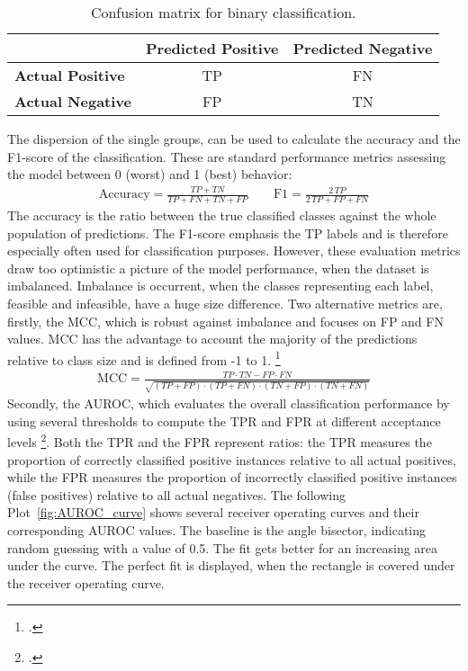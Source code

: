 \begin{table}[ht]
    \centering
    \small
    \begin{tabular}{@{}lcc@{}}
        \toprule
                                 & \textbf{Predicted Positive} & \textbf{Predicted Negative} \\
        \midrule
        \textbf{Actual Positive} & \Gls{TP}                    & \Gls{FN}                    \\
        \textbf{Actual Negative} & \Gls{FP}                    & \Gls{TN}                    \\
        \bottomrule
    \end{tabular}
    \caption{Confusion matrix for binary classification.}
    \label{tab:confusion_matrix}
\end{table}

The dispersion of the single groups, can be used to calculate the accuracy and the F1-score of the classification.
These are standard performance metrics assessing the model between 0 (worst) and 1 (best) behavior:
\begin{align}
    \text{Accuracy}=\frac{TP+TN}{TP+FN+TN+FP}
    \qquad
    \text{F1}=\frac{2\,TP}{2\,TP+FP+FN}
\end{align}
The accuracy is the ratio between the true classified classes against the whole population
of predictions. The F1-score emphasis the \gls{TP} labels and is therefore especially
often used for classification purposes.
However, these evaluation metrics draw too optimistic a picture of the model performance,
when the dataset is imbalanced. Imbalance is occurrent,
when the classes representing each label, feasible and infeasible, have a huge size difference.
Two alternative metrics are, firstly, the \gls{MCC}, which is robust against imbalance
and focuses on \gls{FP} and \gls{FN} values. \gls{MCC} has the advantage to account the majority of the predictions
relative to class size and is defined from -1 to 1. \footcite[cf.][pp. 2--3, 5]{chicco_advantages_2020}
\begin{align}
    \text{MCC}=\frac{TP \cdot TN - FP \cdot FN}{\sqrt{(TP+FP)\cdot(TP+FN)\cdot(TN+FP)\cdot(TN+FN)}}
\end{align}
Secondly, the \gls{AUROC}, which evaluates the overall classification performance by using several thresholds to compute the \gls{TPR}
and \gls{FPR} at different acceptance levels \footcite[cf.][p. 2 f.]{chicco_advantages_2020}. Both the \gls{TPR} and the
\gls{FPR} represent ratios: the \gls{TPR} measures the proportion of correctly classified positive instances relative to all
actual positives, while the \gls{FPR} measures the proportion of incorrectly classified positive instances (false positives)
relative to all actual negatives.
The following Plot~\ref{fig:AUROC_curve} shows several receiver operating curves and their corresponding \gls{AUROC} values.
The baseline is the angle bisector, indicating random guessing with a value of 0.5. The fit gets better
for an increasing area under the curve. The perfect fit is displayed, when the rectangle is covered under the receiver operating curve.

